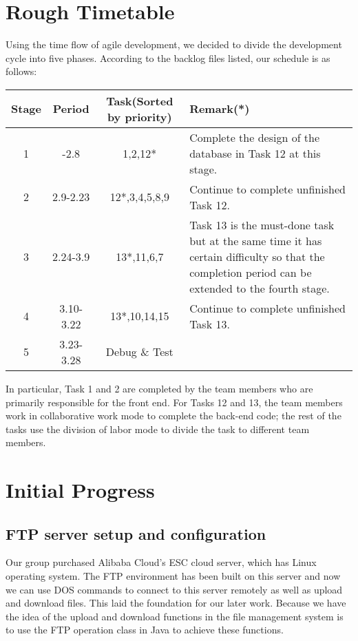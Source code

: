 \documentclass[a4paper,11pt]{article}
\begin{document}
\section{Rough Timetable}
Using the time flow of agile development, we decided to divide the development cycle into five phases. According to the backlog files listed, our schedule is as follows:
\begin{table}[H]
\centering
\begin{tabular}{|c|c|c|p{8cm}|}
\hline
Stage & Period & Task(Sorted by priority) & Remark(*) \\
\hline
1 & -2.8 & 1,2,12* & Complete the design of the database in Task 12 at this stage. \\
\hline
2 & 2.9-2.23 & 12*,3,4,5,8,9 & Continue to complete
unfinished Task 12.
 \\
\hline
3 & 2.24-3.9 & 13*,11,6,7 & Task 13 is the must-done task but at the same time it has certain difficulty so that the completion period can be extended to the fourth stage. \\
\hline
4 & 3.10-3.22 & 13*,10,14,15 & Continue to complete
unfinished Task 13.
\\
\hline
5 & 3.23-3.28 & Debug \& Test &
\\
\hline
\end{tabular}
\end{table}
In particular, Task 1 and 2 are completed by the team members who are primarily responsible for the front end. For Tasks 12 and 13, the team members work in collaborative work mode to complete the back-end code; the rest of the tasks use the division of labor mode to divide the task to different team members.
\section{Initial Progress}
\subsection{FTP server setup and configuration}
Our group purchased Alibaba Cloud’s ESC cloud server, which has Linux operating system. The FTP environment has been built on this server and now we can use DOS commands to connect to this server remotely as well as upload and download files. This laid the foundation for our later work. Because we have the idea of the upload and download functions in the file management system is to use the FTP operation class in Java to achieve these functions.
\end{document}

